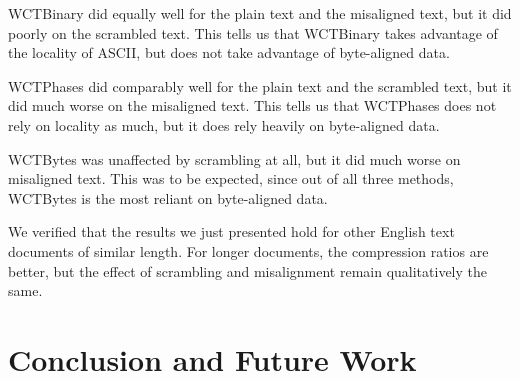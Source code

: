 \documentclass[11pt]{scrartcl}
\begin{document}
WCTBinary did equally well for the plain text and the misaligned text, but it
did poorly on the scrambled text. This tells us that WCTBinary takes advantage
of the locality of ASCII, but does not take advantage of byte-aligned data.

WCTPhases did comparably well for the plain text and the scrambled text, but it
did much worse on the misaligned text. This tells us that WCTPhases does not
rely on locality as much, but it does rely heavily on byte-aligned data.

WCTBytes was unaffected by scrambling at all, but it did much worse on
misaligned text. This was to be expected, since out of all three methods,
WCTBytes is the most reliant on byte-aligned data.

We verified that the results we just presented hold for other English text
documents of similar length. For longer documents, the compression ratios are
better, but the effect of scrambling and misalignment remain qualitatively the
same.



\section{Conclusion and Future Work}


\printbibliography
\end{document}
